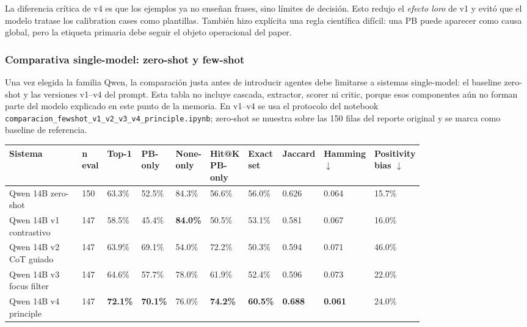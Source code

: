 La diferencia crítica de v4 es que los ejemplos ya no enseñan frases, sino límites de decisión. Esto redujo el \emph{efecto loro} de v1 y evitó que el modelo tratase los calibration cases como plantillas. También hizo explícita una regla científica difícil: una PB puede aparecer como causa global, pero la etiqueta primaria debe seguir el objeto operacional del paper.

\subsubsection*{Comparativa single-model: zero-shot y few-shot}

Una vez elegida la familia Qwen, la comparación justa antes de introducir agentes debe limitarse a sistemas single-model: el baseline zero-shot y las versiones v1--v4 del prompt. Esta tabla no incluye cascada, extractor, scorer ni critic, porque esos componentes aún no forman parte del modelo explicado en este punto de la memoria. En v1--v4 se usa el protocolo del notebook \texttt{comparacion\_fewshot\_v1\_v2\_v3\_v4\_principle.ipynb}; zero-shot se muestra sobre las 150 filas del reporte original y se marca como baseline de referencia.

\begin{center}
\scriptsize
\setlength{\tabcolsep}{3pt}
\renewcommand{\arraystretch}{1.15}
\begin{tabular}{p{0.22\linewidth}p{0.05\linewidth}p{0.065\linewidth}p{0.065\linewidth}p{0.065\linewidth}p{0.065\linewidth}p{0.065\linewidth}p{0.065\linewidth}p{0.065\linewidth}p{0.065\linewidth}}
\toprule
Sistema & n eval & Top-1 & PB-only & None-only & Hit@K PB-only & Exact set & Jaccard & Hamming $\downarrow$ & Positivity bias $\downarrow$ \\
\midrule
Qwen 14B zero-shot & 150 & 63.3\% & 52.5\% & 84.3\% & 56.6\% & 56.0\% & 0.626 & 0.064 & 15.7\% \\
Qwen 14B v1 contrastivo & 147 & 58.5\% & 45.4\% & \textbf{84.0\%} & 50.5\% & 53.1\% & 0.581 & 0.067 & 16.0\% \\
Qwen 14B v2 CoT guiado & 147 & 63.9\% & 69.1\% & 54.0\% & 72.2\% & 50.3\% & 0.594 & 0.071 & 46.0\% \\
Qwen 14B v3 focus filter & 147 & 64.6\% & 57.7\% & 78.0\% & 61.9\% & 52.4\% & 0.596 & 0.073 & 22.0\% \\
Qwen 14B v4 principle & 147 & \textbf{72.1\%} & \textbf{70.1\%} & 76.0\% & \textbf{74.2\%} & \textbf{60.5\%} & \textbf{0.688} & \textbf{0.061} & 24.0\% \\
\bottomrule
\end{tabular}
\end{center}

